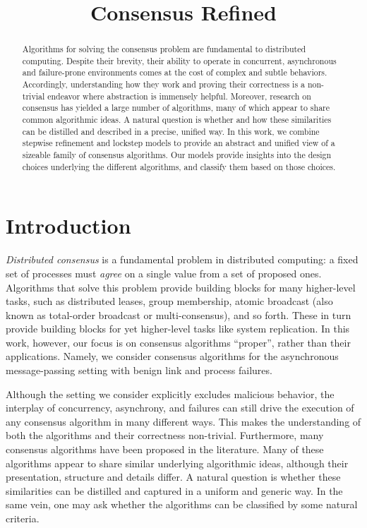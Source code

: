 \documentclass[12pt]{article}
\begin{document}
\title{Consensus Refined}
\begin{abstract}
  Algorithms for solving the consensus problem are fundamental to
  distributed computing. Despite their brevity, their
  ability to operate in concurrent, asynchronous and failure-prone
  environments comes at the cost of complex and subtle
  behaviors. Accordingly, understanding how they work and proving
  their correctness is a non-trivial endeavor where abstraction
  is immensely helpful.
%  
  Moreover, research on consensus has yielded a large number of
  algorithms, many of which appear to share common algorithmic
  ideas. A natural question is whether and how these similarities can
  be distilled and described in a precise, unified 
  way.
%
  In this work, we combine stepwise refinement and
  lockstep models to provide an abstract and unified
  view of a sizeable family of consensus algorithms. Our models
  provide insights into the design choices underlying the different 
  algorithms, and classify them based on those choices.  
\end{abstract}

\maketitle
\tableofcontents

\newpage

\section{Introduction}
\label{sec:introduction}

\emph{Distributed consensus} is a fundamental problem in distributed
computing: a fixed set of processes must \textit{agree} on a single
value from a set of proposed ones. Algorithms that solve this problem
provide building blocks for many higher-level tasks, such as
distributed leases, group membership, atomic broadcast (also known as
total-order broadcast or multi-consensus), and so forth. These in turn
provide building blocks for yet higher-level tasks like system
replication. In this work, however, our focus is on consensus
algorithms ``proper'', rather than their applications.
Namely, we consider consensus algorithms for the asynchronous
message-passing setting with benign link and process failures. 

Although the setting we consider explicitly excludes malicious
behavior, the interplay of concurrency, asynchrony, and failures can
still drive the execution of any consensus algorithm in many different
ways. This makes the understanding of both the algorithms and their
correctness non-trivial. Furthermore, many consensus algorithms have
been proposed in the literature. Many of these algorithms appear to
share similar underlying algorithmic ideas, although their
presentation, structure and details differ. A natural question is
whether these similarities can be distilled and captured in a uniform
and generic way. In the same vein, one may ask whether the algorithms
can be classified by some natural criteria.
\end{document}
